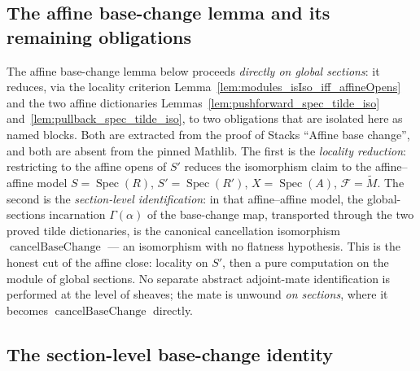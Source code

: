 \subsection{The affine base-change lemma and its remaining obligations}

The affine base-change lemma below proceeds \emph{directly on global sections}: it
reduces, via the locality criterion
Lemma~\ref{lem:modules_isIso_iff_affineOpens} and the two affine dictionaries
Lemmas~\ref{lem:pushforward_spec_tilde_iso} and~\ref{lem:pullback_spec_tilde_iso},
to two obligations that are isolated here as named blocks. Both are extracted from
the proof of Stacks ``Affine base change'', and both are absent from the pinned
Mathlib. The first is the \emph{locality reduction}: restricting to the affine opens
of \(S'\) reduces the isomorphism claim to the affine--affine model
\(S = \operatorname{Spec}(R)\), \(S' = \operatorname{Spec}(R')\),
\(X = \operatorname{Spec}(A)\), \(\mathcal{F} = \widetilde{M}\). The second is the
\emph{section-level identification}: in that affine--affine model, the global-sections
incarnation \(\Gamma(\alpha)\) of the base-change map, transported through the two
proved tilde dictionaries, is the canonical cancellation isomorphism
\(\operatorname{cancelBaseChange}\) — an isomorphism with no flatness hypothesis. This
is the honest cut of the affine close: locality on \(S'\), then a pure computation on
the module of global sections. No separate abstract adjoint-mate identification is
performed at the level of sheaves; the mate is unwound \emph{on sections}, where it
becomes \(\operatorname{cancelBaseChange}\) directly.


\subsection{The section-level base-change identity}

